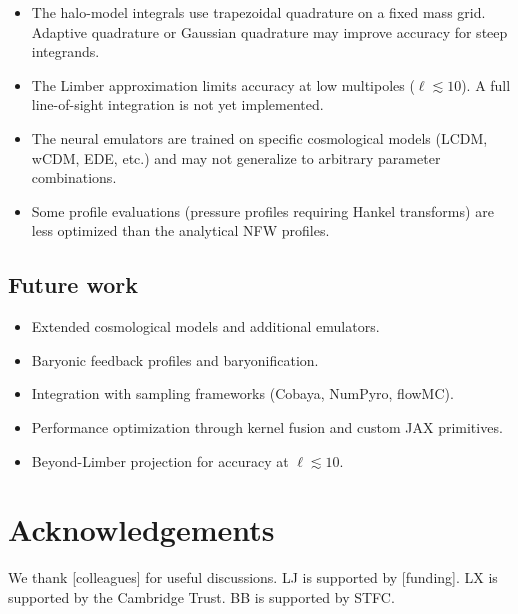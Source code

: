 \documentclass[12pt, preprint]{aastex631}
\begin{document}
\begin{itemize}
    \item The halo-model integrals use trapezoidal quadrature on a fixed mass grid. Adaptive quadrature or Gaussian quadrature may improve accuracy for steep integrands.
    \item The Limber approximation limits accuracy at low multipoles ($\ell \lesssim 10$). A full line-of-sight integration is not yet implemented.
    \item The neural emulators are trained on specific cosmological models (LCDM, wCDM, EDE, etc.) and may not generalize to arbitrary parameter combinations.
    \item Some profile evaluations (pressure profiles requiring Hankel transforms) are less optimized than the analytical NFW profiles.
\end{itemize}

\subsection{Future work}

\begin{itemize}
    \item Extended cosmological models and additional emulators.
    \item Baryonic feedback profiles and baryonification.
    \item Integration with sampling frameworks (Cobaya, NumPyro, flowMC).
    \item Performance optimization through kernel fusion and custom JAX primitives.
    \item Beyond-Limber projection for accuracy at $\ell \lesssim 10$.
\end{itemize}


\section*{Acknowledgements}
We thank [colleagues] for useful discussions. LJ is supported by [funding]. LX is supported by the Cambridge Trust. BB is supported by STFC.




\end{document}
